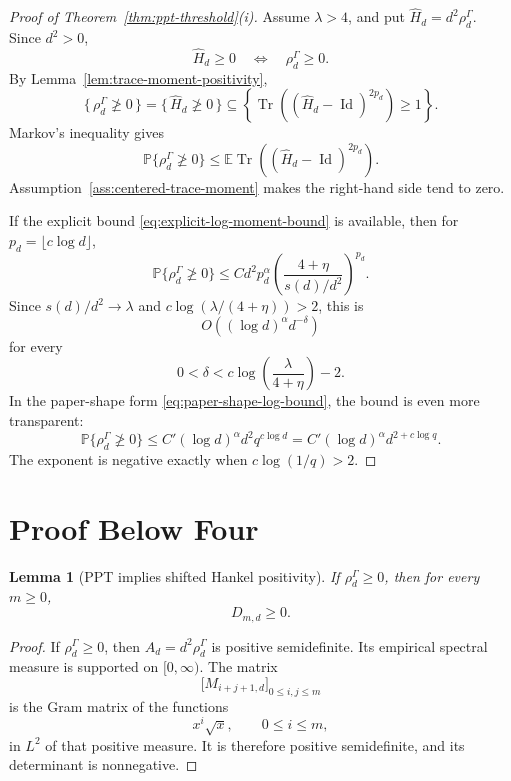 \documentclass[11pt,reqno]{amsart}
\newtheorem{lemma}[theorem]{Lemma}
\newcommand{\PP}{\mathbb P}
\newcommand{\EE}{\mathbb E}
\newcommand{\Tr}{\operatorname{Tr}}
\newcommand{\Id}{\operatorname{Id}}
\begin{document}
\begin{proof}[Proof of Theorem~\ref{thm:ppt-threshold}(i)]
Assume \(\lambda>4\), and put \(\widehat H_d=d^2\rho_d^\Gamma\).  Since
\(d^2>0\),
\[
  \widehat H_d\ge0
  \quad\Longleftrightarrow\quad
  \rho_d^\Gamma\ge0.
\]
By Lemma~\ref{lem:trace-moment-positivity},
\[
  \{\,\rho_d^\Gamma\ngeq0\,\}
  =
  \{\,\widehat H_d\ngeq0\,\}
  \subseteq
  \left\{
    \Tr\left((\widehat H_d-\Id)^{2p_d}\right)\ge1
  \right\}.
\]
Markov's inequality gives
\[
  \PP\{\rho_d^\Gamma\ngeq0\}
  \le
  \EE\Tr\left((\widehat H_d-\Id)^{2p_d}\right).
\]
Assumption~\ref{ass:centered-trace-moment} makes the right-hand side tend
to zero.

If the explicit bound \eqref{eq:explicit-log-moment-bound} is available,
then for \(p_d=\lfloor c\log d\rfloor\),
\[
  \PP\{\rho_d^\Gamma\ngeq0\}
  \le
  C d^2 p_d^\alpha
  \left(\frac{4+\eta}{s(d)/d^2}\right)^{p_d}.
\]
Since \(s(d)/d^2\to\lambda\) and
\(c\log(\lambda/(4+\eta))>2\), this is
\[
  O\left((\log d)^\alpha d^{-\delta}\right)
\]
for every
\[
  0<\delta<c\log\left(\frac{\lambda}{4+\eta}\right)-2.
\]
In the paper-shape form \eqref{eq:paper-shape-log-bound}, the bound is even
more transparent:
\[
  \PP\{\rho_d^\Gamma\ngeq0\}
  \le C'(\log d)^\alpha d^2q^{c\log d}
  =
  C'(\log d)^\alpha d^{2+c\log q}.
\]
The exponent is negative exactly when \(c\log(1/q)>2\).
\end{proof}

\section{Proof Below Four}

\begin{lemma}[PPT implies shifted Hankel positivity]
\label{lem:ppt-hankel}
If \(\rho_d^\Gamma\ge0\), then for every \(m\ge0\),
\[
  D_{m,d}\ge0.
\]
\end{lemma}

\begin{proof}
If \(\rho_d^\Gamma\ge0\), then \(A_d=d^2\rho_d^\Gamma\) is positive
semidefinite.  Its empirical spectral measure is supported on
\([0,\infty)\).  The matrix
\[
  \bigl[M_{i+j+1,d}\bigr]_{0\le i,j\le m}
\]
is the Gram matrix of the functions
\[
  x^{i}\sqrt{x},
  \qquad 0\le i\le m,
\]
in \(L^2\) of that positive measure.  It is therefore positive
semidefinite, and its determinant is nonnegative.
\end{proof}
\end{document}
